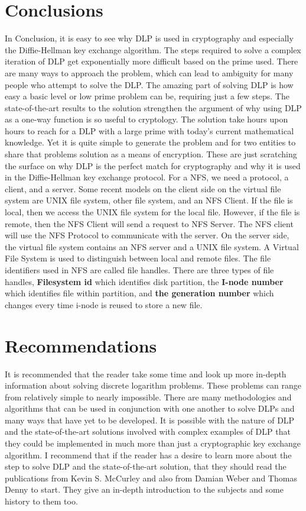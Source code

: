 \documentclass{article}
\begin{document}
\section{Conclusions}
    In Conclusion, it is easy to see why DLP is used in cryptography and especially the Diffie-Hellman key exchange algorithm. The steps required to solve a complex iteration of DLP get exponentially more difficult based on the prime used. There are many ways to approach the problem, which can lead to ambiguity for many people who attempt to solve the DLP. The amazing part of solving DLP is how easy a basic level or low prime problem can be, requiring just a few steps. The state-of-the-art results to the solution strengthen the argument of why using DLP as a one-way function is so useful to cryptology. The solution take hours upon hours to reach for a DLP with a large prime with today's current mathematical knowledge. Yet it is quite simple to generate the problem and for two entities to share that problems solution as a means of encryption. These are just scratching the surface on why DLP is the perfect match for cryptography and why it is used in the Diffie-Hellman key exchange protocol. For a NFS, we need a protocol, a client, and a server. Some recent models on the client side on the virtual file system are UNIX file system, other file system, and an NFS Client. If the file is local, then we access the UNIX file system for the local file. However, if the file is remote, then the NFS Client will send a request to NFS Server. The NFS client will use the NFS Protocol to communicate with the server. On the server side, the virtual file system contains an NFS server and a UNIX file system. A Virtual File System is used to distinguish between local and remote files. The file identifiers used in NFS are called file handles. There are three types of file handles, \textbf{Filesystem id} which identifies disk partition, the \textbf{I-node number} which identifies file within partition, and \textbf{the generation number} which changes every time i-node is reused to store a new file. 

\section{Recommendations}
    It is recommended that the reader take some time and look up more in-depth information about solving discrete logarithm problems. These problems can range from relatively simple to nearly impossible. There are many methodologies and algorithms that can be used in conjunction with one another to solve DLPs and many ways that have yet to be developed. It is possible with the nature of DLP and the state-of-the-art solutions involved with complex examples of DLP that they could be implemented in much more than just a cryptographic key exchange algorithm. I recommend that if the reader has a desire to learn more about the step to solve DLP and the state-of-the-art solution, that they should read the publications from Kevin S. McCurley and also from Damian Weber and Thomas Denny to start. They give an in-depth introduction to the subjects and some history to them too.
\end{document}
